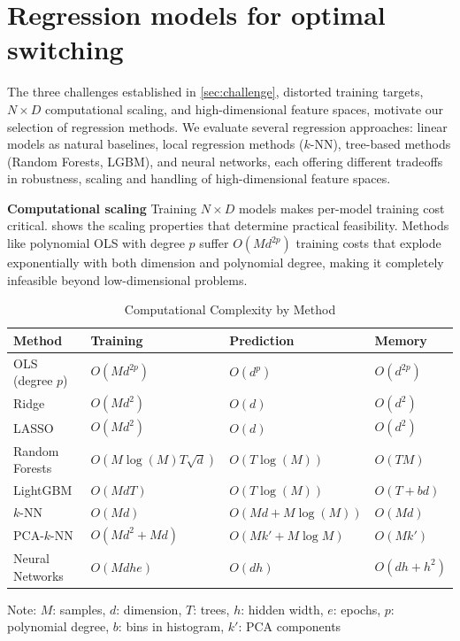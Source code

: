 \documentclass[11pt,reqno,a4paper]{amsart}
\theoremstyle{definition}
\numberwithin{equation}{section}
\DeclareMathOperator{\1}{\mathbbm{1}}
\begin{document}
\section{Regression models for optimal switching}\label{sec:models}
The three challenges established in \cref{sec:challenge}, distorted training targets, $N\times D$ computational scaling, and high-dimensional feature spaces, motivate our selection of regression methods. We evaluate several regression approaches: linear models as natural baselines, local regression methods ($k$-NN), tree-based methods (Random Forests, LGBM), and neural networks, each offering different tradeoffs in robustness, scaling and handling of high-dimensional feature spaces.

\textbf{Computational scaling}
Training $N\times D$ models makes per-model training cost critical.  shows the scaling properties that determine practical feasibility. Methods like polynomial OLS with degree $p$ suffer $O(Md^{2p})$ training costs that explode exponentially with both dimension and polynomial degree, making it completely infeasible beyond low-dimensional problems.

\begin{table}[htbp]
  \centering
  \caption{Computational Complexity by Method}
  \label{tab:complexity_comparison}
  \begin{tabular}{llll}
    \hline
    \textbf{Method}  & \textbf{Training}            & \textbf{Prediction} & \textbf{Memory} \\
    \hline
    OLS (degree $p$) & $O(Md^{2p})$                 & $O(d^p)$            & $O(d^{2p})$     \\
    Ridge            & $O(Md^2)$                    & $O(d)$              & $O(d^2)$        \\
    LASSO            & $O(Md^2)$                    & $O(d)$              & $O(d^2)$        \\
    Random Forests   & $O(M \log (M)  T  \sqrt{d})$ & $O(T  \log (M))$    & $O(T  M)$       \\
    LightGBM         & $O(M  d  T)$                 & $O(T  \log (M))$    & $O(T + b  d)$   \\
    $k$-NN           & $O(Md)$                      & $O(Md + M\log (M))$ & $O(Md)$         \\
    PCA-$k$-NN       & $O(Md^2 + Md)$               & $O(Mk' + M\log M)$  & $O(Mk')$        \\
    Neural Networks  & $O(M  d  h  e)$              & $O(d  h)$           & $O(d  h + h^2)$ \\
    \hline
  \end{tabular}

  \medskip
  \footnotesize
  Note: $M$: samples, $d$: dimension, $T$: trees, $h$: hidden width, $e$: epochs, $p$: polynomial degree, $b$: bins in histogram, $k'$: PCA components
\end{table}
\end{document}
